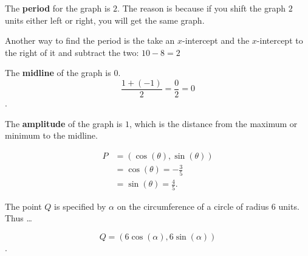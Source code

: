 \begin{solution}
	\label{sol:period}

	The \textbf{period} for the graph is $2$. The reason is because if you shift
	the graph $2$ units either left or right, you will get the same graph.

	Another way to find the period is the take an $x$-intercept and the
	$x$-intercept to the right of it and subtract the two: $10 - 8 = 2$
\end{solution}

\begin{solution}
	\label{sol:midline_and_amplitude}

	The \textbf{midline} of the graph is $0$.
	\[ \frac{1 + (-1)}{2} = \frac{0}{2} = 0 \].

	The \textbf{amplitude} of the graph is $1$, which is the distance from the
	maximum or minimum to the midline.
\end{solution}

\begin{solution}
	\label{sol:angle_of_theta}

	\begin{align*}
		P & = (\cos(\theta), \sin(\theta)) \\
		  & = \cos(\theta) = -\frac{3}{5}  \\
		  & = \sin(\theta) = \frac{4}{5}
		.\end{align*}
\end{solution}

\begin{solution}
	\label{sol:using_r_cos_and_r_sin}

	The point $Q$ is specified by $\alpha$ on the circumference of a circle of
	radius $6$ units. Thus \ldots

	\[ Q = (6 \cos (\alpha), 6 \sin (\alpha)) \].
\end{solution}

